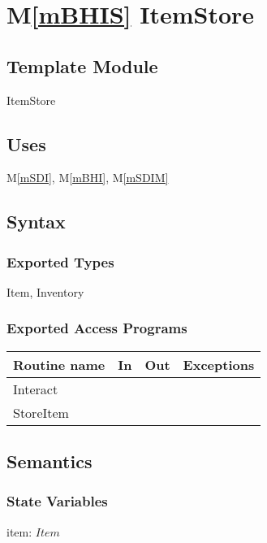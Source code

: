\documentclass[12pt]{article}
\newcommand{\mref}[1]{M\ref{#1}}
\begin{document}
\newpage

\section* {\mref{mBHIS} ItemStore}

\subsection*{Template Module}

ItemStore

\subsection* {Uses}

\mref{mSDI}, \mref{mBHI}, \mref{mSDIM}\\

\subsection* {Syntax}

\subsubsection* {Exported Types}

Item, Inventory

\subsubsection* {Exported Access Programs}

\begin{tabular}{| l | l | l | l |}
\hline
\textbf{Routine name} & \textbf{In} & \textbf{Out} & \textbf{Exceptions}\\
\hline
Interact & ~ & ~  & ~\\
StoreItem & ~ & ~ & ~\\
\hline
\end{tabular}

\subsection* {Semantics}

\subsubsection* {State Variables}

item: $Item$
\end{document}
